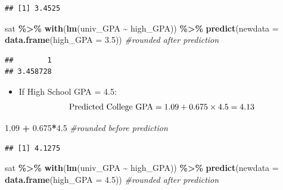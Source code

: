 \documentclass[
]{book}
\newenvironment{Shaded}{\begin{snugshade}}{\end{snugshade}}
\newcommand{\AttributeTok}[1]{\textcolor[rgb]{0.13,0.29,0.53}{#1}}
\newcommand{\CommentTok}[1]{\textcolor[rgb]{0.56,0.35,0.01}{\textit{#1}}}
\newcommand{\FloatTok}[1]{\textcolor[rgb]{0.00,0.00,0.81}{#1}}
\newcommand{\FunctionTok}[1]{\textcolor[rgb]{0.13,0.29,0.53}{\textbf{#1}}}
\newcommand{\NormalTok}[1]{#1}
\newcommand{\SpecialCharTok}[1]{\textcolor[rgb]{0.81,0.36,0.00}{\textbf{#1}}}
\providecommand{\tightlist}{%
  \setlength{\itemsep}{0pt}\setlength{\parskip}{0pt}}
\begin{document}
\begin{verbatim}
## [1] 3.4525
\end{verbatim}

\begin{Shaded}
\begin{Highlighting}[]
\NormalTok{sat }\SpecialCharTok{\%\textgreater{}\%}
  \FunctionTok{with}\NormalTok{(}\FunctionTok{lm}\NormalTok{(univ\_GPA }\SpecialCharTok{\textasciitilde{}}\NormalTok{ high\_GPA)) }\SpecialCharTok{\%\textgreater{}\%}
  \FunctionTok{predict}\NormalTok{(}\AttributeTok{newdata =} \FunctionTok{data.frame}\NormalTok{(}\AttributeTok{high\_GPA =} \FloatTok{3.5}\NormalTok{)) }\CommentTok{\#rounded after prediction}
\end{Highlighting}
\end{Shaded}

\begin{verbatim}
##        1 
## 3.458728
\end{verbatim}

\begin{itemize}
\tightlist
\item
  If High School GPA = 4.5:\\
  \[ \hbox{Predicted College GPA} = 1.09 + 0.675 \times 4.5 = 4.13 \]
\end{itemize}

\begin{Shaded}
\begin{Highlighting}[]
\FloatTok{1.09} \SpecialCharTok{+} \FloatTok{0.675}\SpecialCharTok{*}\FloatTok{4.5} \CommentTok{\#rounded before prediction}
\end{Highlighting}
\end{Shaded}

\begin{verbatim}
## [1] 4.1275
\end{verbatim}

\begin{Shaded}
\begin{Highlighting}[]
\NormalTok{sat }\SpecialCharTok{\%\textgreater{}\%}
  \FunctionTok{with}\NormalTok{(}\FunctionTok{lm}\NormalTok{(univ\_GPA }\SpecialCharTok{\textasciitilde{}}\NormalTok{ high\_GPA)) }\SpecialCharTok{\%\textgreater{}\%}
  \FunctionTok{predict}\NormalTok{(}\AttributeTok{newdata =} \FunctionTok{data.frame}\NormalTok{(}\AttributeTok{high\_GPA =} \FloatTok{4.5}\NormalTok{)) }\CommentTok{\#rounded after prediction }
\end{Highlighting}
\end{Shaded}
\end{document}
